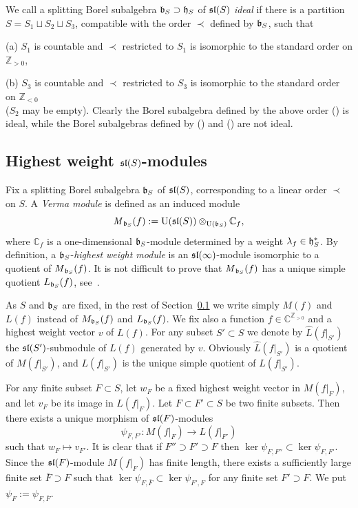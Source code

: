 \documentclass[10pt]{amsart}\oddsidemargin -1mm \evensidemargin -1mm \topmargin -15mm\headheight5mm \headsep 3.5mm \textheight 245mm\textwidth 170mm %
\theoremstyle{definition}\newtheorem{theorem}{Theorem}[section]\newtheorem{lemma}[theorem]{Lemma}\newtheorem{remark}[theorem]{Remark}\newtheorem{proposition}[theorem]{Proposition}\newtheorem{corollary}[theorem]{Corollary}\newtheorem{definition}[theorem]{Definition}\newtheorem{Ex}[theorem]{Example}
\begin{document}
We call a splitting Borel subalgebra $\frak b_S\supset \frak h_S$ of $\frak{sl}(S)$ {\it ideal} if there is a partition $S=S_1\sqcup S_2\sqcup S_3$, compatible with the order $\prec$ defined by $\frak b_S$, such that

(a) $S_1$ is countable and $\prec$ restricted to $S_1$ is isomorphic to the standard order on $\mathbb Z_{>0}$,

(b) $S_3$ is countable and $\prec$ restricted to $S_3$ is isomorphic to the standard order on $\mathbb Z_{<0}$\\
($S_2$ may be empty). Clearly the Borel subalgebra defined by the above order () is ideal, while the Borel subalgebras defined by () and () are not ideal.

\subsection{Highest weight $\frak{sl}(S)$-modules}\label{SSmi}%
Fix a splitting Borel subalgebra $\frak b_S$ of $\frak{sl}(S)$, corresponding to a linear order $\prec$ on $S$. A {\it Verma module} is defined as an induced module
$$\operatorname{{\it M}}_{\frak b_S}(f):=\operatorname{\mathrm{U}}(\frak{sl}(S))\otimes_{\operatorname{\mathrm{U}}(\frak b_S)}\mathbb C_f,$$
where $\mathbb C_f$ is a one-dimensional $\frak b_S$-module
determined by a weight $\lambda_f\in\frak h_S^*$. By definition, a $\frak b_S$-{\it{}highest weight module} is an $\frak{sl}(\infty)$-module isomorphic to a quotient of $\operatorname{{\it M}}_{\frak b_S}(f)$. It is not difficult to prove that $\operatorname{{\it M}}_{\frak b_S}(f)$ has a unique simple quotient $L_{\frak b_S}(f)$, see~\cite{DP}. %

As $S$ and $\frak b_S$ are fixed, in the rest of Section~\ref{SSmi} we write simply $M(f)$ and $L(f)$ instead of $M_{\frak b_S}(f)$ and $L_{\frak b_S}(f)$. We fix also a function $f\in\mathbb C^{\mathbb Z_{>0}}$ and a highest weight vector $v$ of $L(f)$. For any subset $S'\subset S$ we denote by $\widehat L(f|_{S'})$ the $\frak{sl}(S')$-submodule of $L(f)$ generated by $v$. Obviously $\widehat L(f|_{S'})$ is a quotient of $M(f|_{S'})$, and $L(f|_{S'})$ is the unique simple quotient of $\widehat L(f|_{S'}).$

For any finite subset $F\subset S$, let $w_F$ be a fixed highest weight vector in $M(f|_F)$, and let $v_F$ be its image in $L(f|_F)$. Let $F\subset F'\subset S$ be two finite subsets. Then there exists a unique morphism of $\frak{sl}(F)$-modules $$\psi_{F, F'}: M(f|_F)\to L(f|_{F'})$$
such that $w_F\mapsto v_{F'}$. It is clear that if $F''\supset F'\supset F$ then $\ker \psi_{F, F''}\subset \ker \psi_{F, F'}$. Since the $\frak{sl}(F)$-module $M(f|_F)$ has finite length, there exists a sufficiently large finite set $\bar F\supset F$ such that $\ker \psi_{F, \bar F}\subset \ker\psi_{F', F}$ for any finite set $F'\supset F$. We put $\psi_F:=\psi_{F, \bar F}$.
\end{document}
